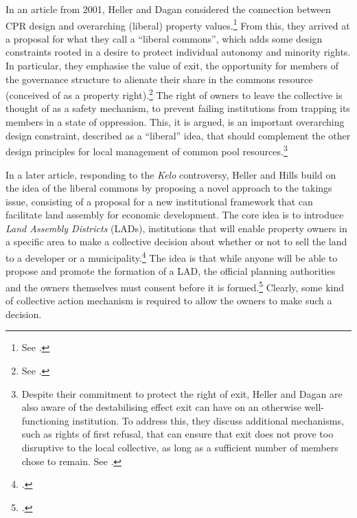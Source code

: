 In an article from 2001, Heller and Dagan considered the connection between CPR design and overarching (liberal) property values.\footnote{See \cite{heller01}.} From this, they arrived at a proposal for what they call a ``liberal commons'', which adds some design constraints rooted in a desire to protect individual autonomy and minority rights. In particular, they emphasise the value of exit, the opportunity for members of the governance structure to alienate their share in the commons resource (conceived of as a property right).\footnote{See \cite[567-572]{heller01}.} The right of owners to leave the collective is thought of as a safety mechanism, to prevent failing institutions from trapping its members in a state of oppression. This, it is argued, is an important overarching design constraint, described as a ``liberal'' idea, that should complement the other design principles for local management of common pool resources.\footnote{Despite their commitment to protect the right of exit, Heller and Dagan are also aware of the destabilising effect exit can have on an otherwise well-functioning institution. To address this, they discuss additional mechanisms, such as rights of first refusal, that can ensure that exit does not prove too disruptive to the local collective, as long as a sufficient number of members chose to remain. See \cite[596-702]{heller01}.}

In a later article, responding to the {\it Kelo} controversy, Heller and Hills build on the idea of the liberal commons by proposing a novel approach to the takings issue, consisting of a proposal for a new institutional framework that can facilitate land assembly for economic development. The core idea is to introduce {\it Land Assembly Districts} (LADs), institutions that will enable property owners in a specific area to make a collective decision about whether or not to sell the land to a developer or a municipality.\footcite[1469-1470]{heller08} The idea is that while anyone will be able to propose and promote the formation of a LAD, the official planning authorities and the owners themselves must consent before it is formed.\footcite[1488-1489]{heller08} Clearly, some kind of collective action mechanism is required to allow the owners to make such a decision. 


